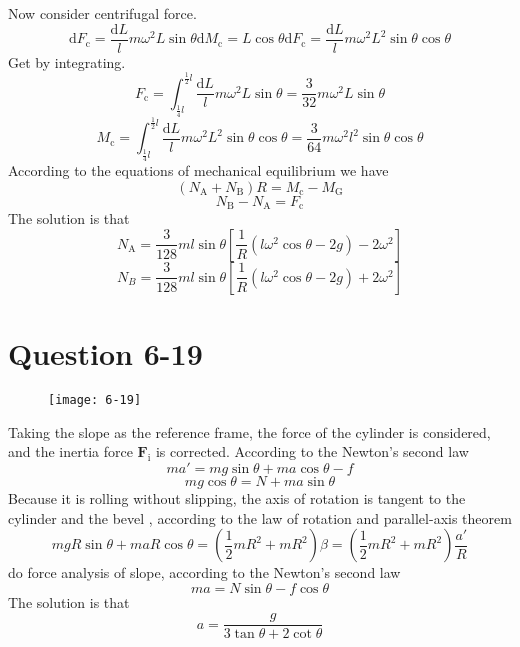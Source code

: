 \documentclass[12pt,a4paper]{article}%
\begin{document}
	\noindent Now consider centrifugal force.
	\begin{equation}
		\mathrm{d}F_{\mathrm{c}}=\frac{\mathrm{d}L}{l}m\omega ^2L\sin \theta 
		\mathrm{d}M_{\mathrm{c}}=L\cos \theta \mathrm{d}F_{\mathrm{c}}
		=\frac{\mathrm{d}L}{l}m\omega ^2L^2\sin \theta \cos \theta
	\end{equation}
	Get by integrating.
	\begin{equation}
		F_{\mathrm{c}}=\int_{\frac{1}{4}l}^{\frac{1}{2}l}{\frac{\mathrm{d}L}{l}m\omega ^2L\sin \theta} =\frac{3}{32}m\omega ^2L\sin \theta 
	\end{equation}	 
	\begin{equation}
		M_{\mathrm{c}}=\int_{\frac{1}{4}l}^{\frac{1}{2}l}{\frac{\mathrm{d}L}{l}m\omega ^2L^2\sin \theta \cos \theta} =\frac{3}{64}m\omega ^2l^2\sin \theta \cos \theta			
	\end{equation}
	According to the equations of mechanical equilibrium we have
	\begin{equation}
		\left( N_{\mathrm{A}}+N_{\mathrm{B}} \right) R=M_{\mathrm{c}}-M_{\mathrm{G}}
	\end{equation}
	\begin{equation}
		N_{\mathrm{B}}-N_{\mathrm{A}}=F_{\mathrm{c}}
	\end{equation}
	The solution is that
	\begin{equation*}
		N_{\mathrm{A}}=\frac{3}{128}ml\sin \theta \left[ \frac{1}{R}\left( l\omega ^2\cos \theta -2g \right) -2\omega ^2 \right] 
	\end{equation*}
	\begin{equation*}
		N_B=\frac{3}{128}ml\sin \theta \left[ \frac{1}{R}\left( l\omega ^2\cos \theta -2g \right) +2\omega ^2 \right] 
	\end{equation*}
	\section{Question 6-19}
	\begin{figure}[H]
		\centering
		\texttt{[image: 6-19]}
		\caption*{}
		\label{fig:6-19}
	\end{figure}
	\noindent Taking the slope as the reference frame, the force of the cylinder is considered, and the inertia force $\boldsymbol{F}_\mathrm{i}$ is corrected. According to the Newton's second law
	\begin{equation}
		ma'=mg\sin \theta +ma\cos \theta -f
	\end{equation}
	\begin{equation}
		mg\cos\theta=N+ma\sin\theta
	\end{equation}
	Because it is rolling without slipping, the axis of rotation is tangent to the cylinder and the bevel
	, according to the law of rotation and parallel-axis theorem
	\begin{equation}
		mgR\sin \theta +maR\cos \theta 
		=\left( \frac{1}{2}mR^2+mR^2 \right) \beta
		=\left( \frac{1}{2}mR^2+mR^2 \right) \frac{a'}{R}
	\end{equation}
	do force analysis of slope, according to the Newton's second law
	\begin{equation}
		ma=N\sin\theta-f\cos\theta
	\end{equation}
	The solution is that
	$$
	a=\frac{g}{3\tan\theta+2\cot\theta}
	$$
\end{document}
